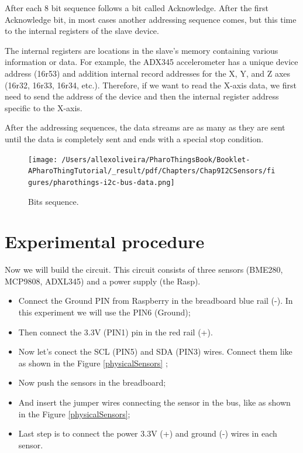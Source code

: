 \documentclass[10pt,twoside,english]{_support/latex/sbabook/sbabook}
\begin{document}
After each 8 bit sequence follows a bit called Acknowledge. After the first Acknowledge bit, in most cases another addressing sequence comes, but this time to the internal registers of the slave device. 

The internal registers are locations in the slave's memory containing various information or data. For example, the ADX345 accelerometer has a unique device address (16r53) and addition internal record addresses for the X, Y, and Z axes (16r32, 16r33, 16r34, etc.). Therefore, if we want to read the X-axis data, we first need to send the address of the device and then the internal register address specific to the X-axis.

After the addressing sequences, the data streams are as many as they are sent until the data is completely sent and ends with a special stop condition.


\begin{figure}

\begin{center}
\texttt{[image: /Users/allexoliveira/PharoThingsBook/Booklet-APharoThingTutorial/\_result/pdf/Chapters/Chap9I2CSensors/figures/pharothings-i2c-bus-data.png]}\caption{Bits sequence.\label{I2CBusPacket}}\end{center}
\end{figure}

\section{Experimental procedure}
Now we will build the circuit. This circuit consists of three sensors (BME280, MCP9808, ADXL345) and a power supply (the Rasp).

\begin{itemize}
\item Connect the Ground PIN from Raspberry in the breadboard blue rail (-). In this experiment we will use the PIN6 (Ground);
\item Then connect the 3.3V (PIN1) pin in the red rail (+). 
\item Now let's conect the SCL (PIN5) and SDA (PIN3) wires. Connect them like as shown in the Figure \ref{physicalSensors} ;
\item Now push the sensors in the breadboard;
\item And insert the jumper wires connecting the sensor in the bus, like as shown in the Figure \ref{physicalSensors};
\item Last step is to connect the power 3.3V (+) and ground (-) wires in each sensor.
\end{itemize}
\end{document}

